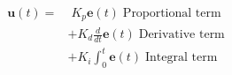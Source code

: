 \documentclass[preview]{standalone}
\begin{document}
\newcommand{\vect}[1] {\mathbf{#1}}
\begin{align*}
\vect{u}(t) = &\; K_p \vect{e}(t) \; \text{Proportional term} \\
              &+ K_d\frac{d}{dt}\vect{e}(t)  \; \text{Derivative term} \\
              &+ K_i\int_0^t\vect{e}(t)  \; \text{Integral term} 
\end{align*}
\end{document}
